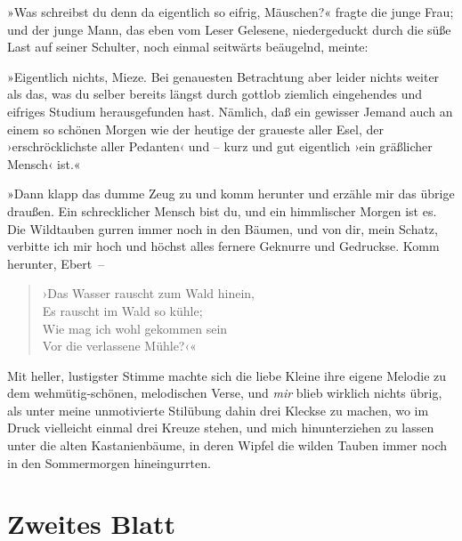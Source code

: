 »Was schreibst du denn da eigentlich so eifrig, Mäuschen?« fragte
die junge Frau; und der junge Mann, das eben vom Leser Gelesene,
niedergeduckt durch die süße Last auf seiner Schulter, noch einmal
seitwärts beäugelnd, meinte:

»Eigentlich nichts, Mieze. Bei genauesten Betrachtung aber leider
nichts weiter als das, was du selber bereits längst durch gottlob
ziemlich eingehendes und eifriges Studium herausgefunden hast.
Nämlich, daß ein gewisser Jemand auch an einem so schönen Morgen
wie der heutige der graueste aller Esel, der ›erschröcklichste
aller Pedanten‹ und – kurz und gut eigentlich ›ein gräßlicher
Mensch‹ ist.«

»Dann klapp das dumme Zeug zu und komm herunter und erzähle mir das
übrige draußen. Ein schrecklicher Mensch bist du, und ein
himmlischer Morgen ist es. Die Wildtauben gurren immer noch in den
Bäumen, und von dir, mein Schatz, verbitte ich mir hoch und höchst
alles fernere Geknurre und Gedruckse. Komm herunter, Ebert~–

\begin{verse}
›Das Wasser rauscht zum Wald hinein,\\
Es rauscht im Wald so kühle;\\
Wie mag ich wohl gekommen sein\\
Vor die verlassene Mühle?‹«
\end{verse}

Mit heller, lustigster Stimme machte sich die liebe Kleine ihre
eigene Melodie zu dem wehmütig-schönen, melodischen Verse, und
\emph{mir} blieb wirklich nichts übrig, als unter meine
unmotivierte Stilübung dahin drei Kleckse zu machen, wo im Druck
vielleicht einmal drei Kreuze stehen, und mich hinunterziehen zu
lassen unter die alten Kastanienbäume, in deren Wipfel die wilden
Tauben immer noch in den Sommermorgen hineingurrten.

\section{Zweites Blatt}

